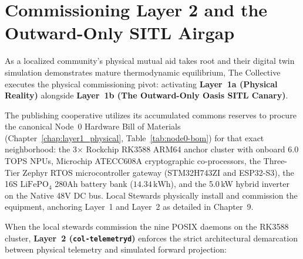 \section{Commissioning Layer 2 and the Outward-Only SITL Airgap}
\label{sec:shadow-sim}

As a localized community's physical mutual aid takes root and their digital twin simulation demonstrates mature thermodynamic equilibrium, The Collective executes the physical commissioning pivot: activating \textbf{Layer~1a (Physical Reality)} alongside \textbf{Layer~1b (The Outward-Only Oasis SITL Canary)}.

The publishing cooperative utilizes its accumulated commons reserves to procure the canonical Node~0 Hardware Bill of Materials (Chapter~\ref{chap:layer1_physical}, Table~\ref{tab:node0-bom}) for that exact neighborhood: the 3$\times$ Rockchip RK3588 ARM64 anchor cluster with onboard 6.0 TOPS NPUs, Microchip ATECC608A cryptographic co-processors, the Three-Tier Zephyr RTOS microcontroller gateway (STM32H743ZI and ESP32-S3), the 16S $\mathrm{LiFePO}_4$ 280Ah battery bank ($14.34\,\mathrm{kWh}$), and the 5.0\,kW hybrid inverter on the Native 48V DC bus. Local Stewards physically install and commission the equipment, anchoring Layer~1 and Layer~2 as detailed in Chapter~9.

When the local stewards commission the nine POSIX daemons on the RK3588 cluster, \textbf{Layer~2 (\texttt{col-telemetryd})} enforces the strict architectural demarcation between physical telemetry and simulated forward projection:

